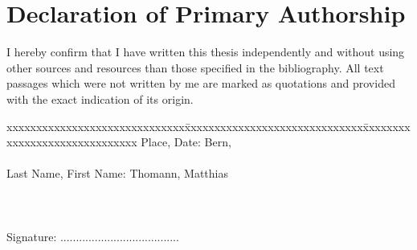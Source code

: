 \section{Declaration of Primary Authorship}

\vspace*{10mm} 

I hereby confirm that I have written this thesis independently and without using other sources and resources than those specified in the bibliography.
All text passages which were not written by me are marked as quotations and provided with the exact indication of its origin. 

\vspace{15mm}

\begin{tabbing}
xxxxxxxxxxxxxxxxxxxxxxxxxxxxxx\=xxxxxxxxxxxxxxxxxxxxxxxxxxxxxx\=xxxxxxxxxxxxxxxxxxxxxxxxxxxxxx\kill
Place, Date:		\> Bern, \versiondate \\ \\ 
Last Name, First Name:	\> Thomann, Matthias \\ \\ \\ \\ 
Signature:	\> ......................................\\
\end{tabbing}